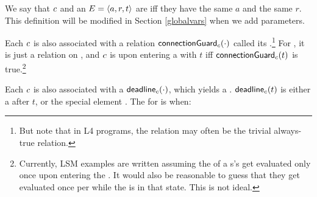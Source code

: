 \documentclass[12pt]{article}
\begin{document}
We say that \nameforaedge $c$ and an \Event $E = \langle a,r,t\rangle$ are  iff they have the same \Action $a$ and the same \Role $r$. This definition will be modified in Section \ref{globalvars} when we add \Event parameters.
\medskip








\medskip

Each \connection $c$ is also associated with a relation $\textsf{connectionGuard}_{c}(\cdot)$ called its .\footnote{But note that in L4 programs, the relation may often be the trivial always-true relation.} For \FSContracts, it is just a relation on \TimeStamps,
and \nameforaedge\xspace $c$ is  upon entering a \GlobalState with \TimeStamp $t$ iff $\textsf{connectionGuard}_{c}(t)$ is true.\footnote{Currently, LSM examples are written assuming the \TGuards of a \State s's \connections get evaluated only once upon entering the \State. It would also be reasonable to guess that they get evaluated once per \TimeUnit while the \Contract is in that state. This is not ideal.}

\medskip

Each \connection $c$ is also associated with a  $\textsf{deadline}_{c}(\cdot)$, which yields a . $\textsf{deadline}_{c}(t)$ is either a \TimeStamp after $t$, or the special element . The \Deadline for \nameforaedge is when:
\end{document}
